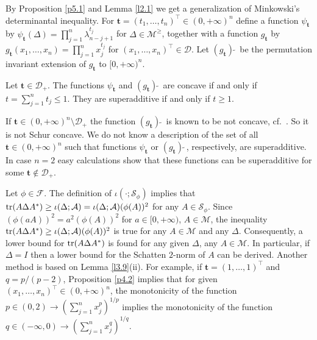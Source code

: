 \documentclass{amsart}
\begin{document}
By Proposition \ref{p5.1} and Lemma \ref{l2.1} we get a generalization of Minkowski's determinantal inequality. For ${\mathbf t}=(t_1,\ldots,t_n)^\top \in(0,+\infty)^n$ define a function $\psi_{{\mathbf t}}$ by $\psi_{{\mathbf t}}(\Delta)=\prod_{j=1}^n \lambda_{n-j+1}^{t_j}$ for $\Delta \in {\mathcal M}^\geq$, together with a function ${g}_{{\mathbf t}}$ by ${g}_{{\mathbf t}}(x_1,\ldots,x_n) = \prod_{j=1}^n x_j^{t_j}$ for $(x_1,\ldots,x_n)^\top \in {\mathcal D}$. Let $({g}_{{\mathbf t}})\tilde{\,\,}$ be the permutation invariant extension of ${g}_{{\mathbf t}}$ to $[0,+\infty)^n$. 

\begin{pro} \label{p5.11}
    Let ${\mathbf t} \in {\mathcal D}_+$. The functions $\psi_{{\mathbf t}}$ and $({g}_{{\mathbf t}})\tilde{\,\,}$ are concave if and only if $t = \sum_{j=1}^n t_j \leq 1$. They are superadditive if and only if $t \geq 1$. 
\end{pro}

If ${\mathbf t} \in (0,+\infty)^n \setminus {\mathcal D}_+$ the function $({g}_{{\mathbf t}})\tilde{\,\,}$ is known to be not concave, cf.~\cite[3.A.2.b]{MOA}. So it is not Schur concave. We do not know a description of the set of all ${\mathbf t} \in (0,+\infty)^n$ such that functions $\psi_{{\mathbf t}}$ or $({g}_{{\mathbf t}})\tilde{\,\,}$, respectively, are superadditive. In case $n=2$ easy calculations show that these functions can be superadditive for some ${\mathbf t} \not\in {\mathcal D}_+$. 

Let $\phi \in {\mathcal F}$. The definition of $\iota( \cdot ; {\mathcal S}_\phi)$ implies that ${\rm tr}(A \Delta A^*) \geq \iota(\Delta ; {\mathcal A}) = \iota(\Delta ; {\mathcal A})(\phi(A))^2$ for any $A \in {\mathcal S}_\phi$. Since $(\phi(aA))^2 = a^2 (\phi(A))^2$ for $a \in [0,+\infty)$, $A \in {\mathcal M}$, the inequality ${\rm tr}(A \Delta A^*) \geq  \iota(\Delta ; {\mathcal A})(\phi(A))^2$ is true for any $A \in \mathcal M$ and any $\Delta$. Consequently, a lower bound for ${\rm tr}(A \Delta A^*)$ is found for any given $\Delta$, any $A \in \mathcal M$. In particular, if $\Delta = I$ then a lower bound for the Schatten $2$-norm of $A$ can be derived. Another method is based on Lemma \ref{l3.9}(ii). For example, if ${\mathbf t}= (1,\ldots,1)^\top$ and $q= p / (p-2)$, Proposition \ref{p4.2} implies that for given $(x_1,\ldots,x_n)^\top \in (0,+\infty)^n$, the monotonicity of the function $p \in (0,2) \to (\sum_{j=1}^n x_j^p)^{1/p}$ implies the monotonicity of the function $q \in (-\infty,0) \to (\sum_{j=1}^n x_j^q)^{1/q}$. 
\end{document}
